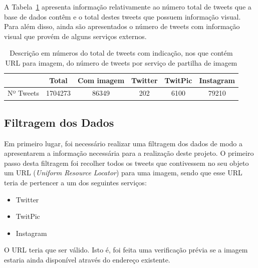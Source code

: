 A Tabela~\ref{tab:nbrtweets} apresenta informação relativamente ao número total de tweets que a base de dados contêm e o total destes tweets que possuem informação visual. Para além disso, ainda são apresentados o número de tweets com informação visual que provém de alguns serviços externos.

\vspace{5 mm}
\begin{table}[h]
\centering
\begin{tabular}{|l|c|c|l|l|l|}
\hline
          & Total                        & Com imagem & Twitter                  & TwitPic                   & Instagram                  \\ \hline
Nº Tweets & \multicolumn{1}{r|}{1704273} & 86349      & \multicolumn{1}{c|}{202} & \multicolumn{1}{c|}{6100} & \multicolumn{1}{c|}{79210} \\ \hline
\end{tabular}
\caption{Descrição em números do total de tweets com indicação, nos que contém URL para imagem, do número de tweets por serviço de partilha de imagem}
\label{tab:nbrtweets}
\end{table}


\subsection{Filtragem dos Dados}

Em primeiro lugar, foi necessário realizar uma filtragem dos dados de modo a apresentarem a informação necessária para a realização deste projeto. O primeiro passo desta filtragem foi recolher todos os tweets que contivessem no seu objeto um URL (\textit{Uniform Resource Locator}) para uma imagem, sendo que esse URL teria de pertencer a um dos seguintes serviços: 

\begin{itemize}
\item Twitter
\item TwitPic
\item Instagram
\end{itemize}
O URL teria que ser válido. Isto é, foi feita uma verificação prévia se a imagem estaria ainda disponível através do endereço existente.


